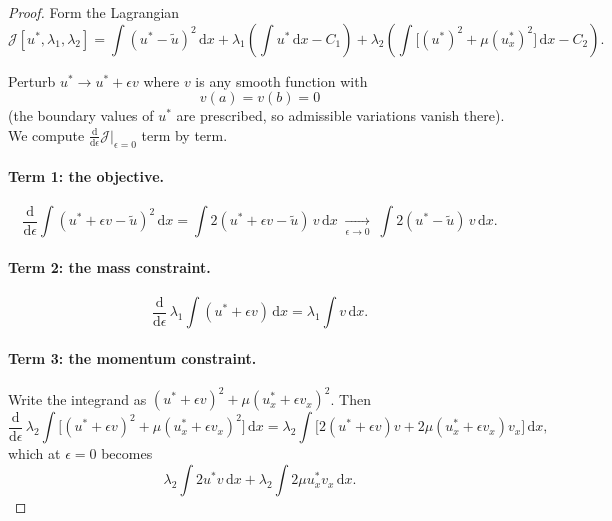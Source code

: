 \documentclass[11pt,a4paper]{article}
\theoremstyle{remark}
\newcommand{\dx}{\,\mathrm{d}x}
\newcommand{\ut}{\tilde{u}}
\newcommand{\us}{u^{*}}
\begin{document}
\begin{proof}
Form the Lagrangian
\begin{equation}
\mathcal{J}[\us,\lambda_1,\lambda_2]
= \int(\us-\ut)^2\dx
+ \lambda_1\left(\int\us\dx - C_1\right)
+ \lambda_2\left(\int\big[(\us)^2 + \mu(\us_x)^2\big]\dx - C_2\right).
\end{equation}

Perturb $\us \to \us + \epsilon v$ where $v$ is any smooth function with
\begin{equation}
v(a) = v(b) = 0
\label{eq:vbc}
\end{equation}
(the boundary values of $\us$ are prescribed, so admissible variations vanish
there). We compute $\frac{\mathrm d}{\mathrm d\epsilon}\mathcal{J}\big|_{\epsilon=0}$
term by term.

\paragraph{Term 1: the objective.}
\begin{equation}
\frac{\mathrm d}{\mathrm d\epsilon}\int(\us+\epsilon v-\ut)^2\dx
= \int 2(\us+\epsilon v-\ut)\,v\dx
\;\xrightarrow[\epsilon\to0]{}\;
\int 2(\us-\ut)\,v\dx .
\end{equation}

\paragraph{Term 2: the mass constraint.}
\begin{equation}
\frac{\mathrm d}{\mathrm d\epsilon}\,\lambda_1\int(\us+\epsilon v)\dx
= \lambda_1\int v\dx .
\end{equation}

\paragraph{Term 3: the momentum constraint.}
Write the integrand as $(\us+\epsilon v)^2 + \mu(\us_x+\epsilon v_x)^2$. Then
\begin{equation}
\frac{\mathrm d}{\mathrm d\epsilon}\,\lambda_2\int\Big[(\us+\epsilon v)^2
+ \mu(\us_x+\epsilon v_x)^2\Big]\dx
= \lambda_2\int\Big[2(\us+\epsilon v)v + 2\mu(\us_x+\epsilon v_x)v_x\Big]\dx,
\end{equation}
which at $\epsilon=0$ becomes
\begin{equation}
\lambda_2\int 2\us v\dx + \lambda_2\int 2\mu \us_x v_x \dx .
\label{eq:term3}
\end{equation}


\end{proof}
\end{document}
